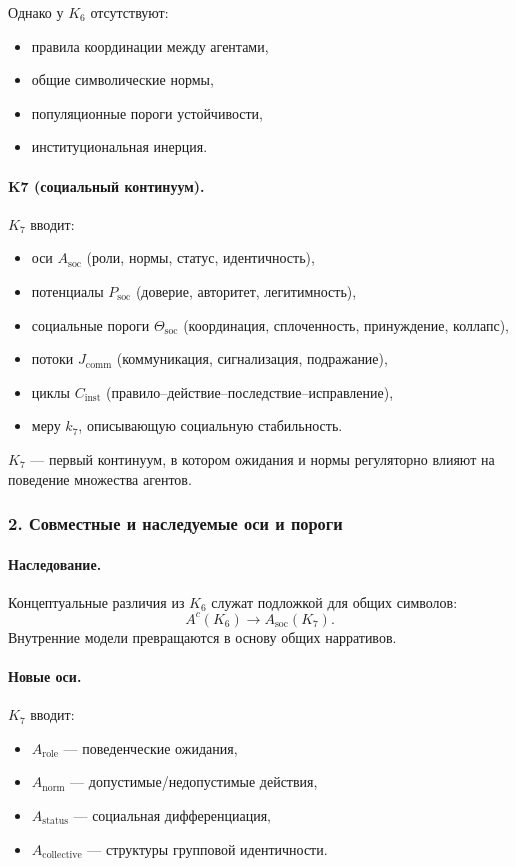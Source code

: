Однако у $K_6$ отсутствуют:
\begin{itemize}
  \item правила координации между агентами,
  \item общие символические нормы,
  \item популяционные пороги устойчивости,
  \item институциональная инерция.
\end{itemize}

\paragraph{K7 (социальный континуум).}
$K_7$ вводит:
\begin{itemize}
  \item оси $A_{\mathrm{soc}}$ (роли, нормы, статус, идентичность),
  \item потенциалы $P_{\mathrm{soc}}$ (доверие, авторитет, легитимность),
  \item социальные пороги $\Theta_{\mathrm{soc}}$ (координация, сплоченность,
        принуждение, коллапс),
  \item потоки $J_{\mathrm{comm}}$ (коммуникация, сигнализация, подражание),
  \item циклы $C_{\mathrm{inst}}$ (правило–действие–последствие–исправление),
  \item меру $k_7$, описывающую социальную стабильность.
\end{itemize}

$K_7$ — первый континуум, в котором ожидания и нормы регуляторно влияют на
поведение множества агентов.

\subsubsection{2. Совместные и наследуемые оси и пороги}

\paragraph{Наследование.}
Концептуальные различия из $K_6$ служат подложкой для общих символов:
\[
A^{c}(K_6) \rightarrow A_{\mathrm{soc}}(K_7).
\]
Внутренние модели превращаются в основу общих нарративов.

\paragraph{Новые оси.}
$K_7$ вводит:
\begin{itemize}
  \item $A_{\mathrm{role}}$ — поведенческие ожидания,
  \item $A_{\mathrm{norm}}$ — допустимые/недопустимые действия,
  \item $A_{\mathrm{status}}$ — социальная дифференциация,
  \item $A_{\mathrm{collective}}$ — структуры групповой идентичности.
\end{itemize}

